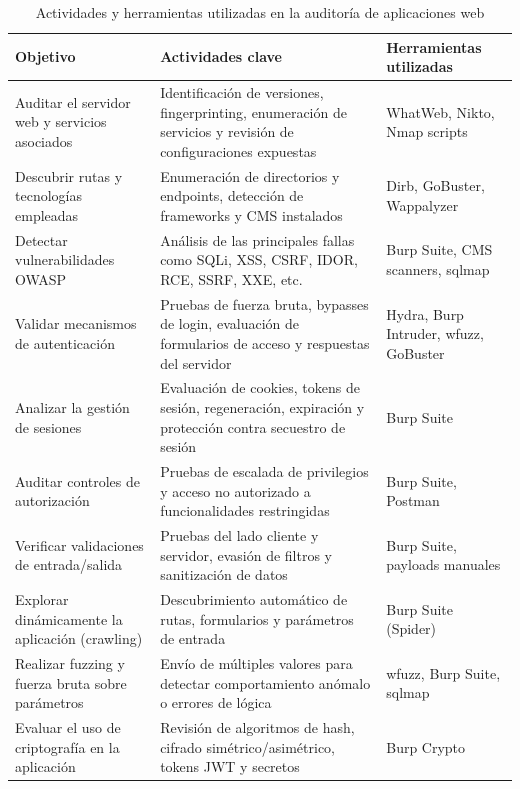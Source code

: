 \documentclass[a4paper, 11pt]{article}
\begin{document}
\begin{table}[H]
\centering
\renewcommand{\arraystretch}{1.4}
\begin{tabular}{|p{4.3cm}|p{7.2cm}|p{3.6cm}|}
\hline
\textbf{Objetivo} & \textbf{Actividades clave} & \textbf{Herramientas utilizadas} \\
\hline
Auditar el servidor web y servicios asociados & Identificación de versiones, fingerprinting, enumeración de servicios y revisión de configuraciones expuestas & WhatWeb, Nikto, Nmap scripts \\
\hline
Descubrir rutas y tecnologías empleadas & Enumeración de directorios y endpoints, detección de frameworks y CMS instalados & Dirb, GoBuster, Wappalyzer \\
\hline
Detectar vulnerabilidades OWASP & Análisis de las principales fallas como SQLi, XSS, CSRF, IDOR, RCE, SSRF, XXE, etc. & Burp Suite, CMS scanners, sqlmap \\
\hline
Validar mecanismos de autenticación & Pruebas de fuerza bruta, bypasses de login, evaluación de formularios de acceso y respuestas del servidor & Hydra, Burp Intruder, wfuzz, GoBuster \\
\hline
Analizar la gestión de sesiones & Evaluación de cookies, tokens de sesión, regeneración, expiración y protección contra secuestro de sesión & Burp Suite \\
\hline
Auditar controles de autorización & Pruebas de escalada de privilegios y acceso no autorizado a funcionalidades restringidas & Burp Suite, Postman \\
\hline
Verificar validaciones de entrada/salida & Pruebas del lado cliente y servidor, evasión de filtros y sanitización de datos & Burp Suite, payloads manuales \\
\hline
Explorar dinámicamente la aplicación (crawling) & Descubrimiento automático de rutas, formularios y parámetros de entrada & Burp Suite (Spider) \\
\hline
Realizar fuzzing y fuerza bruta sobre parámetros & Envío de múltiples valores para detectar comportamiento anómalo o errores de lógica & wfuzz, Burp Suite, sqlmap \\
\hline
Evaluar el uso de criptografía en la aplicación & Revisión de algoritmos de hash, cifrado simétrico/asimétrico, tokens JWT y secretos & Burp Crypto \\
\hline
\end{tabular}
\caption{Actividades y herramientas utilizadas en la auditoría de aplicaciones web}
\label{tab:auditoria_web}
\end{table}
\end{document}
